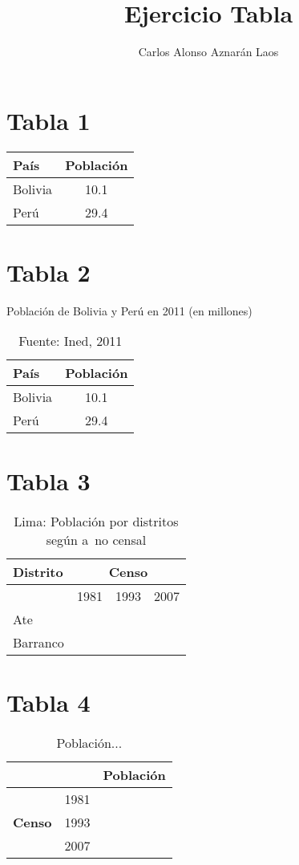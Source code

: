 \documentclass[12pt,a4paper]{article}
\author{Carlos Alonso Aznarán Laos}
\title{Ejercicio Tabla}
\begin{document}
\maketitle
\section{Tabla 1}
\begin{tabular}{|l|c|}
\hline País & Población \\
\hline Bolivia & 10.1 \\
\hline Perú & 29.4 \\
\hline
\end{tabular}
\section{Tabla 2}
\begin{table}[h]
\centering
\caption{Población de Bolivia y Perú en 2011 (en millones)}
\begin{tabular}{lc}
\hline País & Población \\
\hline Bolivia & 10.1 \\ Perú & 29.4\\
\hline \hline
\end{tabular}
\caption*{\scriptsize Fuente: Ined, 2011} \end{table}
\section{Tabla 3}
\begin{table}[h]
\centering
\caption{Lima: Población por distritos según a~no censal}
\begin{tabular}{|l|c|c|c|}
\hline \bf Distrito & \multicolumn{3}{c|}{\bf Censo} \\
\hline & 1981 & 1993 & 2007 \\
\hline Ate&&&\\
\hline Barranco &&&\\
\hline
\end{tabular}
\end{table}
\section{Tabla 4}
\begin{table}[h]
\centering
\caption{Población...}
\begin{tabular}{|l|l|l|} \hline &&\bf Población \\ \hline
\multirow {3}{1.5cm}{\bf Censo} & 1981 & \\ & 1993 & \\ & 2007 & \\
\hline
\end{tabular}
\end{table}
\end{document}
